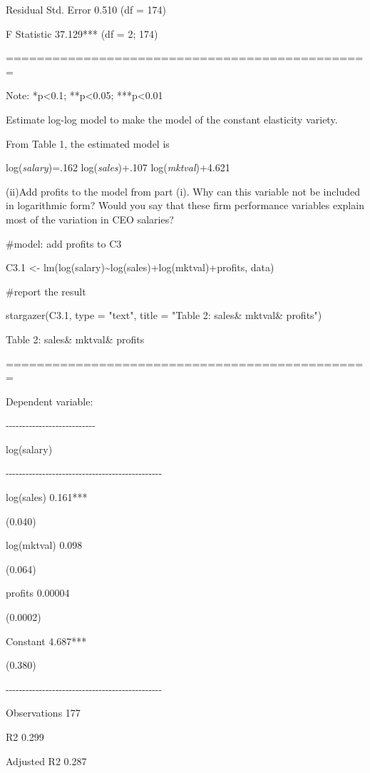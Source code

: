 \documentclass[
]{article}
\begin{document}
Residual Std. Error 0.510 (df = 174)

F Statistic 37.129*** (df = 2; 174)

===============================================

Note: *p\textless0.1; **p\textless0.05; ***p\textless0.01

Estimate log-log model to make the model of the constant elasticity
variety.

From Table 1, the estimated model is

log(\emph{salary})=.162 log(\emph{sales})+.107 log(\emph{mktval})+4.621

(ii)Add profits to the model from part (i). Why can this variable not be
included in logarithmic form? Would you say that these firm performance
variables explain most of the variation in CEO salaries?

\#model: add profits to C3

C3.1 \textless-
lm(log(salary)\textasciitilde log(sales)+log(mktval)+profits, data)

\#report the result

stargazer(C3.1, type = "text", title = "Table 2: sales\& mktval\&
profits")

Table 2: sales\& mktval\& profits

===============================================

Dependent variable:

-\/-\/-\/-\/-\/-\/-\/-\/-\/-\/-\/-\/-\/-\/-\/-\/-\/-\/-\/-\/-\/-\/-\/-\/-\/-\/-

log(salary)

-\/-\/-\/-\/-\/-\/-\/-\/-\/-\/-\/-\/-\/-\/-\/-\/-\/-\/-\/-\/-\/-\/-\/-\/-\/-\/-\/-\/-\/-\/-\/-\/-\/-\/-\/-\/-\/-\/-\/-\/-\/-\/-\/-\/-\/-\/-

log(sales) 0.161***

(0.040)

log(mktval) 0.098

(0.064)

profits 0.00004

(0.0002)

Constant 4.687***

(0.380)

-\/-\/-\/-\/-\/-\/-\/-\/-\/-\/-\/-\/-\/-\/-\/-\/-\/-\/-\/-\/-\/-\/-\/-\/-\/-\/-\/-\/-\/-\/-\/-\/-\/-\/-\/-\/-\/-\/-\/-\/-\/-\/-\/-\/-\/-\/-

Observations 177

R2 0.299

Adjusted R2 0.287
\end{document}
